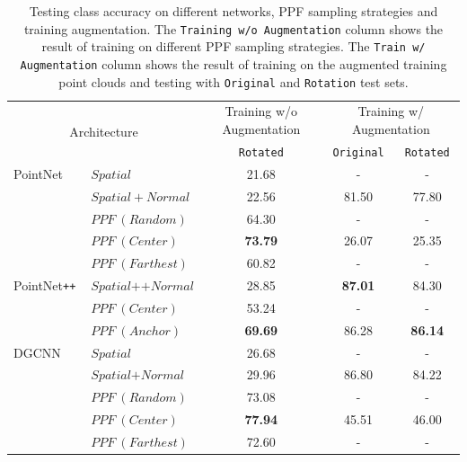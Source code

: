 \documentclass{article}
\begin{document}
\begin{table}[hbt!]
    \centering
    \begin{tabular}{ll|c|cc}\hline\hline
         \multicolumn{2}{c|}{\multirow{2}{*}{Architecture}} & Training w/o Augmentation & \multicolumn{2}{c}{Training w/ Augmentation} \\\cline{3-5}
         & & \texttt{Rotated} & \texttt{Original} & \texttt{Rotated} \\\hline
         PointNet \cite{Qi2017pointnet} & \multicolumn{1}{|l|}{$Spatial$} & 21.68 & - & - \\
         & \multicolumn{1}{|l|}{$Spatial+Normal$} & 22.56 & 81.50 & 77.80 \\
         & \multicolumn{1}{|l|}{$PPF\ (Random)$} & 64.30 & - & - \\
         & \multicolumn{1}{|l|}{$PPF\ (Center)$} & \textbf{73.79} & 26.07 & 25.35 \\
         & \multicolumn{1}{|l|}{$PPF\ (Farthest)$} & 60.82 & - & - \\\hline
         PointNet\texttt{++ \cite{qi2017pointnet2}} & \multicolumn{1}{|l|}{$Spatial\texttt{++}Normal$} & 28.85 & \textbf{87.01} & 84.30 \\
         & \multicolumn{1}{|l|}{$PPF\ (Center)$} & 53.24 & - & - \\
         & \multicolumn{1}{|l|}{$PPF\ (Anchor)$} & \textbf{69.69} & 86.28 & \textbf{86.14}  \\\hline
         DGCNN \cite{Wang2019-dgcnn} & \multicolumn{1}{|l|}{$Spatial$} & 26.68 & - & - \\
         & \multicolumn{1}{|l|}{$Spatial\texttt{+}Normal$} & 29.96 & 86.80 & 84.22 \\
         & \multicolumn{1}{|l|}{$PPF\ (Random)$} & 73.08 & - & - \\
         & \multicolumn{1}{|l|}{$PPF\ (Center)$} & \textbf{77.94} & 45.51 & 46.00 \\
         & \multicolumn{1}{|l|}{$PPF\ (Farthest)$} & 72.60 & - & - \\\hline\hline
    \end{tabular}
    \caption{Testing class accuracy on different networks, PPF sampling strategies and training augmentation. The \texttt{Training w/o Augmentation} column shows the result of training on different PPF sampling strategies. The \texttt{Train w/ Augmentation} column shows the result of training on the augmented training point clouds and testing with \texttt{Original} and \texttt{Rotation} test sets.}
    \label{tab:my_label}
\end{table}
\end{document}
